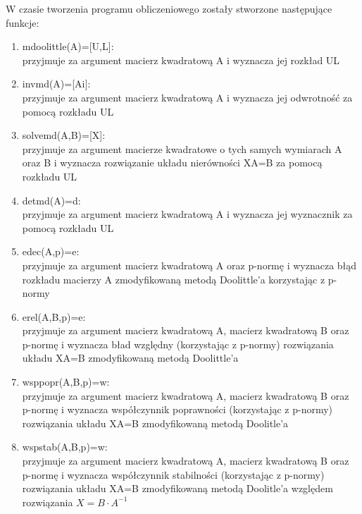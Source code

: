 \documentclass[12pt]{article}
\begin{document}
W czasie tworzenia programu obliczeniowego zosta\l{}y stworzone nast\k{e}puj\k{a}ce funkcje:
\begin{enumerate}
\item mdoolittle(A)=[U,L]:
\\
przyjmuje za argument macierz kwadratow\k{a} A i wyznacza jej rozk\l{}ad UL

\item invmd(A)=[Ai]:
\\
przyjmuje za argument macierz kwadratow\k{a} A i wyznacza jej odwrotno\'s\'c za pomoc\k{a} rozk\l{a}du UL
 
\item solvemd(A,B)=[X]:
\\
przyjmuje za argument macierze kwadratowe o tych samych wymiarach A oraz B i wyznacza rozwi\k{a}zanie uk\l{}adu nier\'owno\'sci XA=B za pomoc\k{a} rozk\l{}adu UL

\item detmd(A)=d:
\\
przyjmuje za argument macierz kwadratow\k{a} A i wyznacza jej wyznacznik za pomoc\k{a} rozk\l{}adu UL
\\
\item edec(A,p)=e:
\\przyjmuje za argument macierz kwadratow\k{a} A oraz p-norm\k{e} i wyznacza b\l{}\k{a}d rozk\l{}adu macierzy A zmodyfikowan\k{a} metod\k{a} Doolittle'a korzystaj\k{a}c z p-normy

\item erel(A,B,p)=e:
\\
przyjmuje za argument macierz kwadratow\k{a} A, macierz kwadratow\k{a} B oraz p-norm\k{e} i wyznacza b\l{a}d wzgl\k{e}dny (korzystaj\k{a}c z p-normy) rozwi\k{a}zania uk\l{}adu XA=B zmodyfikowan\k{a} metod\k{a} Doolittle'a

\item wsppopr(A,B,p)=w:
\\
przyjmuje za argument macierz kwadratow\k{a} A, macierz kwadratow\k{a} B oraz p-norm\k{e} i wyznacza wsp\'o\l{}czynnik poprawno\'sci (korzystaj\k{a}c z p-normy) rozwi\k{a}zania uk\l{}adu XA=B zmodyfikowan\k{a} metod\k{a} Doolitle'a

\item wspstab(A,B,p)=w:
\\
przyjmuje za argument macierz kwadratow\k{a} A, macierz kwadratow\k{a} B oraz p-norm\k{e} i wyznacza wsp\'o\l{}czynnik stabilno\'sci (korzystaj\k{a}c z p-normy) rozwi\k{a}zania uk\l{}adu XA=B zmodyfikowan\k{a} metod\k{a} Doolitle'a wzgl\k{e}dem rozwi\k{a}zania $X=B\cdot A^{-1}$


\end{enumerate}
\end{document}
